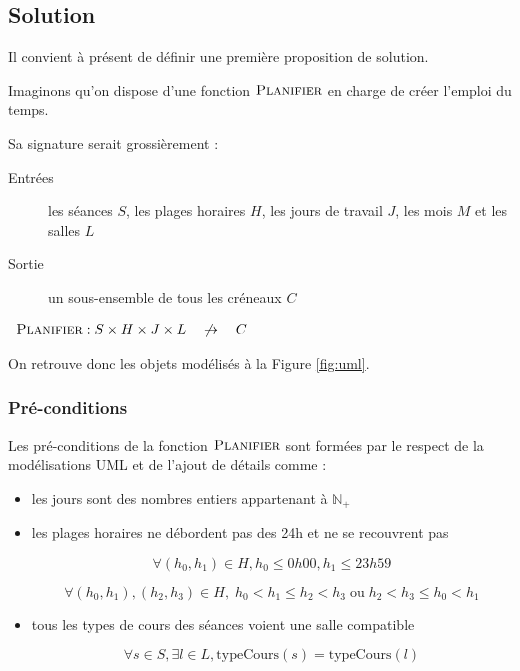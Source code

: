 
\subsection{Solution}

Il convient à présent de définir une première proposition de solution.

Imaginons qu’on dispose d’une fonction $\textsc{Planifier}$ en charge de créer
l’emploi du temps.

Sa signature serait grossièrement :

\begin{description}

\item[Entrées] les séances $S$, les plages horaires $H$, les jours de
travail $J$, les mois $M$ et les salles $L$
\item[Sortie] un sous-ensemble de tous les créneaux $C$

\end{description}

\begin{center}

$\begin{array}{ll}
\textsc{Planifier} : S \times H \times J \times L \quad \not\to \quad C
\end{array}$

\end{center}

On retrouve donc les objets modélisés à la Figure \ref{fig:uml}.

\subsubsection{Pré-conditions}

Les pré-conditions de la fonction $\textsc{Planifier}$ sont formées par le respect
de la modélisations UML et de l'ajout de détails comme :

\begin{itemize}

    \item les jours sont des nombres entiers appartenant à $\mathbb{N}_{+}$
    \item les plages horaires ne débordent pas des 24h et ne se recouvrent pas

        \[
            \forall(h_0, h_1) \in H, h_0 \leq 0h00, h_1 \leq 23h59
        \]

        \[
            \forall(h_0, h_1),(h_2, h_3) \in H, \;
            h_0 < h_1 \leq h_2 < h_3 \;
            \text{ou} \; h_2 < h_3 \leq h_0 < h_1
        \]

    \item tous les types de cours des séances voient une salle compatible

        \[
            \forall s \in S, \exists l \in L, \text{typeCours}(s) =
            \text{typeCours}(l)
        \]

\end{itemize}

